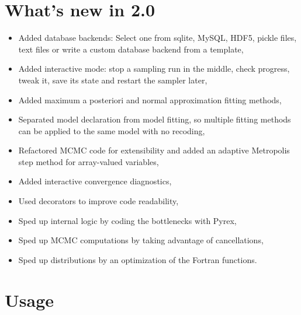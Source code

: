 \section*{What's new in 2.0}
\label{what-s-new-in-2-0}
\begin{itemize}

\item {} 
Added database backends: Select one from sqlite, MySQL, HDF5,
pickle files, text files or write a custom database backend from a template,

\item {} 
Added interactive mode: stop a sampling run in the middle, check progress, tweak it, save its state and restart the sampler
later,

\item {}
Added maximum a posteriori and normal approximation fitting methods,

\item {}
Separated model declaration from model fitting, so multiple fitting methods can be applied to the same model with no recoding,

\item {} 
Refactored MCMC code for extensibility and added an adaptive Metropolis step method for array-valued variables,

\item {} 
Added interactive convergence diagnostics,

\item {} 
Used decorators to improve code readability,

\item {} 
Sped up internal logic by coding the bottlenecks with Pyrex,

\item {}
Sped up MCMC computations by taking advantage of cancellations,

\item {} 
Sped up distributions by an optimization of the Fortran functions.


\end{itemize}



\hypertarget{usage}{}
\section*{Usage}
\label{usage}

